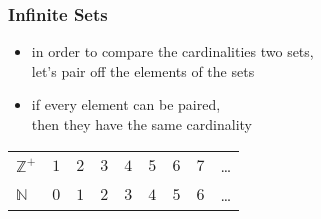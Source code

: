 \documentclass[dvipsnames]{beamer}
\begin{document}
\begin{frame}
  \frametitle{Infinite Sets}

  \begin{itemize}
    \item in order to compare the cardinalities two sets,\\
      let's pair off the elements of the sets
    \item if every element can be paired,\\
      then they have the same cardinality
  \end{itemize}

  \pause
  \begin{example}
    \begin{tabular}{lcccccccc}
      $\mathbb{Z}^+$ & $1$ & $2$ & $3$ & $4$ & $5$ & $6$ & $7$ & \ldots\\
      $\mathbb{N}$   & $0$ & $1$ & $2$ & $3$ & $4$ & $5$ & $6$ & \ldots\\
    \end{tabular}
  \end{example}
\end{frame}
\end{document}
